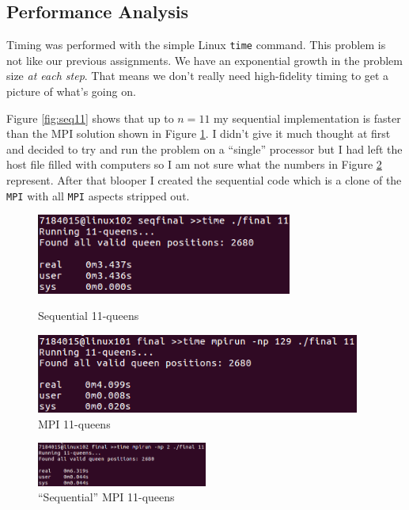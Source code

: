 \documentclass{article}
\begin{document}
\subsection{Performance Analysis}
Timing was performed with the simple Linux \verb|time| command. This problem is 
not like our previous assignments. We have an exponential growth in the problem 
size \textit{at each step}. That means we don't really need high-fidelity timing 
to get a picture of what's going on. 

Figure \ref{fig:seq11} shows that up to $n=11$ my sequential implementation is 
faster than the MPI solution shown in Figure \ref{fig:mpi11}. I didn't give it 
much thought at first and decided to try and run the problem on a ``single'' 
processor but I had left the host file filled with computers so I am not sure 
what the numbers in Figure \ref{fig:mpiseq11} represent. After that blooper I 
created the sequential code which is a clone of the \verb|MPI| with all 
\verb|MPI| aspects stripped out. 

\begin{figure}[h]
    \centering
    \begin{minipage}{0.49\textwidth}
        \centering
        \includegraphics[width=0.75\textwidth]{MPI_2_11}
        \caption{Sequential 11-queens}
        \label{fig:seq11}
    \end{minipage}\hfill
    \begin{minipage}{0.49\textwidth}
        \centering
        \includegraphics[width=0.95\textwidth]{MPI_11}
        \caption{MPI 11-queens}
        \label{fig:mpi11}
    \end{minipage}
\end{figure}


\begin{figure}[h]
    \centering
    \includegraphics[width=0.5\textwidth]{MPI_1_11}
    \caption{``Sequential'' MPI 11-queens}
    \label{fig:mpiseq11}
\end{figure}
\end{document}
